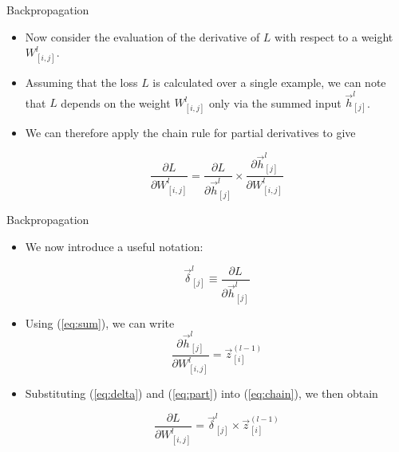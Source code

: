 \documentclass[handout]{beamer}
\begin{document}
\begin{frame}{Backpropagation}
\begin{scriptsize}


\begin{itemize}

\item Now consider the evaluation of the derivative of $L$ with respect to a weight
$W_{[i,j]}^l$.

\item Assuming that the loss $L$ is calculated over a single example, we can note that $L$ depends on the weight $W_{[i,j]}^l$ only via the summed input $\vec{h}_{[j]}^{l}$.


\item We can therefore apply the chain rule for partial derivatives to give

\begin{equation}
\frac{\partial L}{\partial W_{[i,j]}^l} = \frac{\partial L}{\partial \vec{h}_{[j]}^{l}} \times \frac{\partial \vec{h}_{[j]}^{l}}{\partial W_{[i,j]}^l}
\label{eq:chain}
\end{equation}

\end{itemize}


\end{scriptsize}
\end{frame}



\begin{frame}{Backpropagation}
\begin{scriptsize}


\begin{itemize}


\item We now introduce a useful notation:

\begin{equation}
\vec{\delta}_{[j]}^l \equiv \frac{\partial L}{\partial \vec{h}_{[j]}^l}
\label{eq:delta}
\end{equation}

\item Using (\ref{eq:sum}), we can write
\begin{equation}
\frac{\partial \vec{h}_{[j]}^l}{\partial W_{[i,j]}^l} = \vec{z}_{[i]}^{(l-1)}
\label{eq:part}
\end{equation}

\item Substituting (\ref{eq:delta}) and (\ref{eq:part})  into (\ref{eq:chain}), we then obtain

\begin{equation}
\frac{\partial L}{\partial W_{[i,j]}^l} = \vec{\delta}_{[j]}^l \times \vec{z}_{[i]}^{(l-1)}
\label{eq:deltarule}
\end{equation}

\end{itemize}


\end{scriptsize}
\end{frame}
\end{document}
